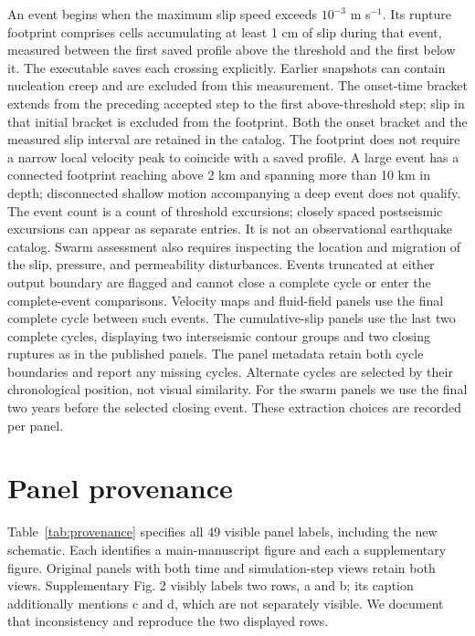 \documentclass[11pt]{article}
\newcommand{\code}[1]{\texttt{\detokenize{#1}}}
\begin{document}
An event begins when the maximum slip speed exceeds $10^{-3}$ m s$^{-1}$.
Its rupture footprint comprises cells accumulating at least 1 cm of slip during
that event, measured between the first saved profile above the threshold and
the first below it. The executable saves each crossing explicitly. Earlier
snapshots can contain nucleation creep and are excluded from this measurement.
The onset-time bracket extends from the preceding accepted step to the first
above-threshold step; slip in that initial bracket is excluded from the footprint.
Both the onset bracket and the measured slip interval are retained in the catalog.
The footprint does not require a narrow local velocity peak to coincide with a saved profile.
A large event has a connected footprint reaching above 2 km and spanning
more than 10 km in depth; disconnected shallow motion accompanying a deep event
does not qualify.
The event count is a count of threshold excursions; closely spaced postseismic
excursions can appear as separate entries. It is not an observational earthquake
catalog. Swarm assessment also requires inspecting the location and migration
of the slip, pressure, and permeability disturbances.
Events truncated at either output boundary are flagged and cannot close a
complete cycle or enter the complete-event comparisons.
Velocity maps and fluid-field panels use the final complete cycle between such events.
The cumulative-slip panels use the last two complete cycles, displaying two
interseismic contour groups and two closing ruptures as in the published panels.
The panel metadata retain both cycle boundaries and report any missing cycles.
Alternate cycles are selected by their chronological position, not visual
similarity. For the swarm panels we use the final two years before the selected
closing event. These extraction choices are recorded per panel.



\section{Panel provenance}
Table~\ref{tab:provenance} specifies all 49 visible panel labels, including the
new schematic. Each \code{F} identifies a main-manuscript figure and each
\code{S} a supplementary figure. Original panels with both time and simulation-step
views retain both views. Supplementary Fig. 2 visibly labels two rows, a and b;
its caption additionally mentions c and d, which are not separately visible.
We document that inconsistency and reproduce the two displayed rows.
\end{document}

